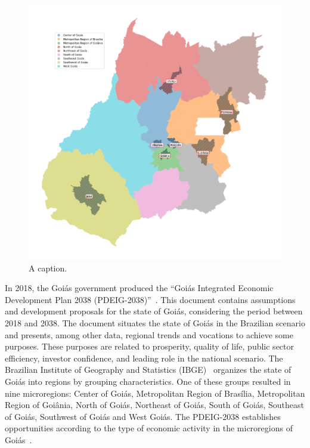 \documentclass[sigconf, review]{educomp}
\begin{document}
\begin{figure}[!htbp]
    \centering
    \includegraphics[width=.9\linewidth]{Images/Map.png}%
    \caption{A caption.}
    \label{fig_map}%
\end{figure}

In 2018, the Goiás government produced the ``Goiás Integrated Economic Development Plan 2038 (PDEIG-2038)''~\cite{goias2038}.
This document contains assumptions and development proposals for the state of Goiás, considering the period between 2018 and 2038.
The document situates the state of Goiás in the Brazilian scenario and presents, among other data, regional trends and vocations to achieve some purposes.
These purposes are related to prosperity, quality of life, public sector efficiency, investor confidence, and leading role in the national scenario.
The Brazilian Institute of Geography and Statistics (IBGE)~\cite{ibge2020} organizes the state of Goiás into regions by grouping characteristics.
One of these groups resulted in nine microregions: Center of Goiás, Metropolitan Region of Brasília, Metropolitan Region of Goiânia, North of Goiás, Northeast of Goiás, South of Goiás, Southeast of Goiás, Southwest of Goiás and West Goiás.
The PDEIG-2038 establishes opportunities according to the type of economic activity in the microregions of Goiás~\cite{ibge2020}.

\end{document}
